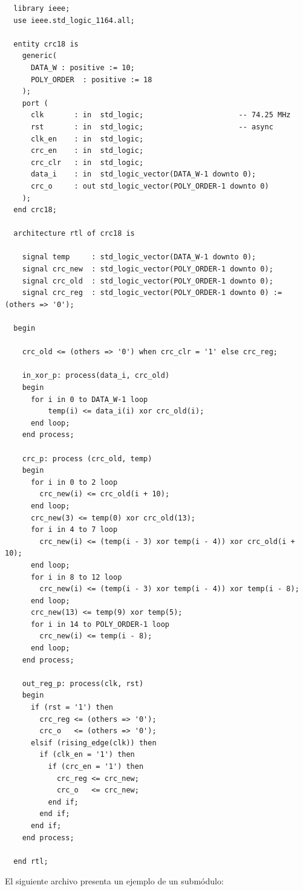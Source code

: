 {\scriptsize\begin{verbatim}
  library ieee;
  use ieee.std_logic_1164.all;

  entity crc18 is
    generic(
      DATA_W : positive := 10;
      POLY_ORDER  : positive := 18
    );
    port (
      clk       : in  std_logic;                      -- 74.25 MHz
      rst       : in  std_logic;                      -- async
      clk_en    : in  std_logic;
      crc_en    : in  std_logic;
      crc_clr   : in  std_logic;
      data_i    : in  std_logic_vector(DATA_W-1 downto 0);
      crc_o     : out std_logic_vector(POLY_ORDER-1 downto 0)
    );
  end crc18;

  architecture rtl of crc18 is

    signal temp     : std_logic_vector(DATA_W-1 downto 0);
    signal crc_new  : std_logic_vector(POLY_ORDER-1 downto 0);
    signal crc_old  : std_logic_vector(POLY_ORDER-1 downto 0);
    signal crc_reg  : std_logic_vector(POLY_ORDER-1 downto 0) := (others => '0');

  begin

    crc_old <= (others => '0') when crc_clr = '1' else crc_reg;

    in_xor_p: process(data_i, crc_old)
    begin
      for i in 0 to DATA_W-1 loop
          temp(i) <= data_i(i) xor crc_old(i);
      end loop;
    end process;

    crc_p: process (crc_old, temp)
    begin
      for i in 0 to 2 loop
        crc_new(i) <= crc_old(i + 10);
      end loop;
      crc_new(3) <= temp(0) xor crc_old(13);
      for i in 4 to 7 loop
        crc_new(i) <= (temp(i - 3) xor temp(i - 4)) xor crc_old(i + 10);
      end loop;
      for i in 8 to 12 loop
        crc_new(i) <= (temp(i - 3) xor temp(i - 4)) xor temp(i - 8);
      end loop;
      crc_new(13) <= temp(9) xor temp(5);
      for i in 14 to POLY_ORDER-1 loop
        crc_new(i) <= temp(i - 8);
      end loop;
    end process;

    out_reg_p: process(clk, rst)
    begin
      if (rst = '1') then
        crc_reg <= (others => '0');
        crc_o   <= (others => '0');
      elsif (rising_edge(clk)) then
        if (clk_en = '1') then
          if (crc_en = '1') then
            crc_reg <= crc_new;
            crc_o   <= crc_new;
          end if;
        end if;
      end if;
    end process;

  end rtl;
\end{verbatim}}

El siguiente archivo presenta un ejemplo de un submódulo:

